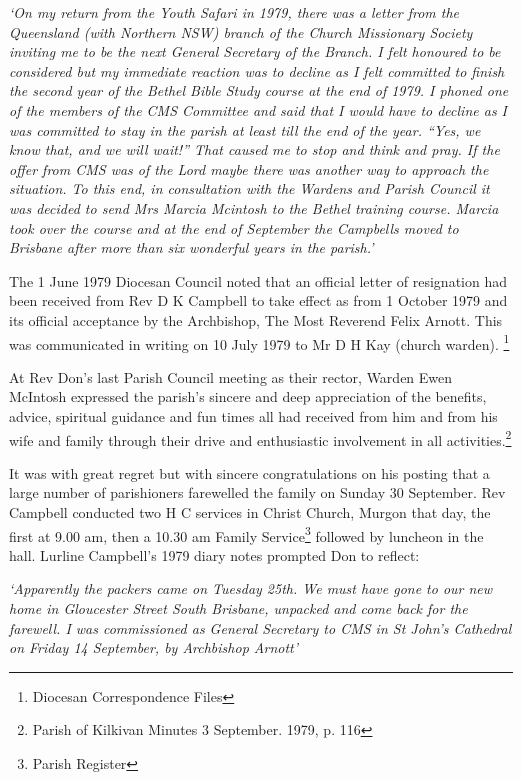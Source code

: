 \emph{`On my return from the Youth Safari in 1979, there was a letter from the Queensland (with Northern NSW) branch of the Church Missionary Society inviting me to be the next General Secretary of the Branch. I felt honoured to be considered but my immediate reaction was to decline as I felt committed to finish the second year of the Bethel Bible Study course at the end of 1979. I phoned one of the members of the CMS Committee and said that I would have to decline as I was committed to stay in the parish at least till the end of the year. ``Yes, we know that, and we will wait!'' That caused me to stop and think and pray. If the offer from CMS was of the Lord maybe there was another way to approach the situation. To this end, in consultation with the Wardens and Parish Council it was decided to send Mrs Marcia Mcintosh to the Bethel training course. Marcia took over the course and at the end of September the Campbells moved to Brisbane after more than six wonderful years in the parish.'}



The 1 June 1979 Diocesan Council noted that an official letter of resignation had been received from Rev D K Campbell to take effect as from 1 October 1979 and its official acceptance by the Archbishop, The Most Reverend Felix Arnott. This was communicated in writing on 10 July 1979 to Mr D H Kay (church warden). \footnote{Diocesan Correspondence Files}


At Rev Don's last Parish Council meeting as their rector, Warden Ewen McIntosh expressed the parish's sincere and deep appreciation of the benefits, advice, spiritual guidance and fun times all had received from him and from his wife and family through their drive and enthusiastic involvement in all activities.\footnote{Parish of Kilkivan Minutes 3 September. 1979, p. 116}


It was with great regret but with sincere congratulations on his posting that a large number of parishioners farewelled the family on Sunday 30 September. Rev Campbell conducted two H C services in Christ Church, Murgon that day, the first at 9.00 am, then a 10.30 am Family Service\footnote{Parish Register} followed by luncheon in the hall. Lurline Campbell's 1979 diary notes prompted Don to reflect:


\emph{`Apparently the packers came on Tuesday 25th. We must have gone to our new home in Gloucester Street South Brisbane, unpacked and come back for the farewell. I was commissioned as General Secretary to CMS in St John's Cathedral on Friday 14 September, by Archbishop Arnott'}



